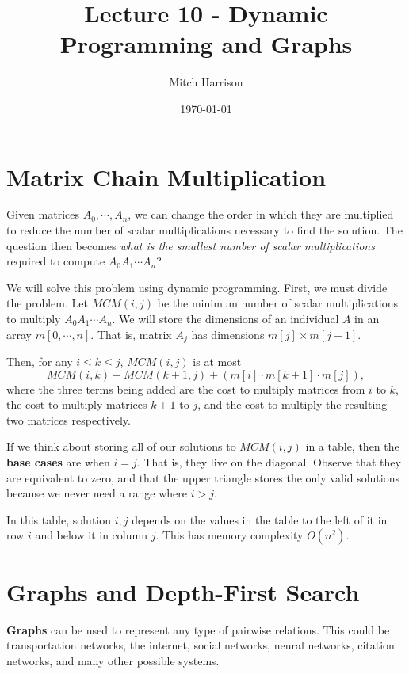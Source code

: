 \documentclass[titlepage, 12pt, leqno]{article}
\title{\Huge{Lecture 10 - Dynamic Programming and Graphs}}
\author{\large{Mitch Harrison}}
\date{\today}
\begin{document}
\setlength{\parskip}{1\baselineskip}
\setlength{\parindent}{15pt}
\maketitle
\tableofcontents
\newpage


\section{Matrix Chain Multiplication}

Given matrices $A_{0}, \cdots , A_{n}$, we can change the order in which they
are multiplied to reduce the number of scalar multiplications necessary to
find the solution. The question then becomes \textit{what is the smallest
number of scalar multiplications} required to compute $A_{0}A_{1} \cdots A_{n}$?

We will solve this problem using dynamic programming. First, we must divide the
problem. Let $MCM(i,j)$ be the minimum number of scalar multiplications to
multiply $A_{0}A_{1} \cdots A_{n}$. We will store the dimensions of an 
individual $A$ in an array $m[0, \cdots ,n]$. That is, matrix $A_{j}$ has
dimensions $m[j] \times m[j+1]$.

Then, for any $i\le k \le j$, $MCM(i,j)$ is at most
\[
    MCM(i,k) + MCM(k+1,j) + \left(m[i] \cdot m[k+1] \cdot m[j]\right),
\]
where the three terms being added are the cost to multiply matrices from $i$ to
$k$, the cost to multiply matrices $k+1$ to $j$, and the cost to multiply the
resulting two matrices respectively.

If we think about storing all of our solutions to $MCM(i,j)$ in a table, then
the \textbf{base cases} are when $i=j$. That is, they live on the diagonal. 
Observe that they are equivalent to zero, and that the upper triangle stores 
the only valid solutions because we never need a range where $i>j$.

In this table, solution $i,j$ depends on the values in the table to the left of
it in row $i$ and below it in column $j$. This has memory complexity $O(n^{2})$.

\pagebreak
\section{Graphs and Depth-First Search}

\textbf{Graphs} can be used to represent any type of pairwise relations. This
could be transportation networks, the internet, social networks, neural networks,
citation networks, and many other possible systems.
\end{document}
